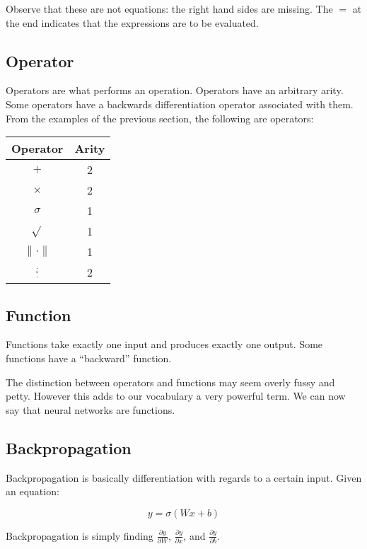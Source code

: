 \documentclass{article}
\begin{document}
Observe that these are not equations: the right hand sides are missing. The $=$ at the end indicates that the expressions are to be evaluated.

\subsection{Operator}

Operators are what performs an operation. Operators have an arbitrary arity. Some operators have a backwards differentiation operator associated with them. From the examples of the previous section, the following are operators:

\begin{table}[ht]
  \centering
  \begin{tabular}{|c|c|}
    \hline
    Operator & Arity\\
    \hline
    $+$ & 2 \\
    $\times$ & 2\\
    $\sigma$ & 1\\
    $\sqrt{}$  & 1\\
    $\|\cdot\|$ & 1\\
    $\frac{\cdot}{\cdot}$ & 2\\
    \hline
  \end{tabular}
\end{table}

\subsection{Function}

Functions take exactly one input and produces exactly one output. Some functions have a ``backward'' function.

The distinction between operators and functions may seem overly fussy and petty. However this adds to our vocabulary a very powerful term. We can now say that neural networks are functions.

\subsection{Backpropagation}

Backpropagation is basically differentiation with regards to a certain input. Given an equation:

$$
y = \sigma(Wx + b)
$$

Backpropagation is simply finding $\frac{\partial y}{\partial W}$, $\frac{\partial y}{\partial x}$, and $\frac{\partial y}{\partial b}$.
\end{document}
